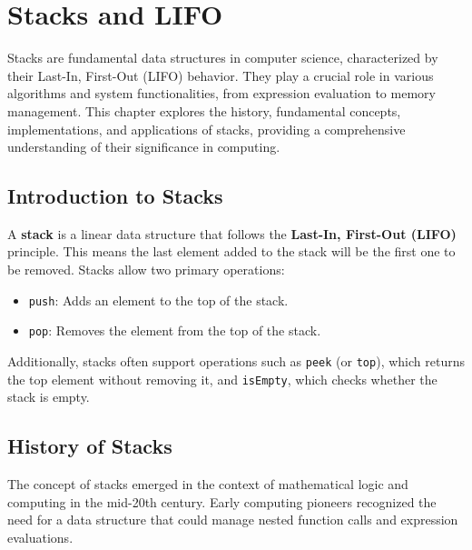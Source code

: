 
\chapter{Stacks and LIFO}

Stacks are fundamental data structures in computer science, characterized by their Last-In, First-Out (LIFO) behavior. They play a crucial role in various algorithms and system functionalities, from expression evaluation to memory management. This chapter explores the history, fundamental concepts, implementations, and applications of stacks, providing a comprehensive understanding of their significance in computing.

\section{Introduction to Stacks}

A \textbf{stack} is a linear data structure that follows the \textbf{Last-In, First-Out (LIFO)} principle. This means the last element added to the stack will be the first one to be removed. Stacks allow two primary operations:

\begin{itemize}
    \item \texttt{push}: Adds an element to the top of the stack.
    \item \texttt{pop}: Removes the element from the top of the stack.
\end{itemize}

Additionally, stacks often support operations such as \texttt{peek} (or \texttt{top}), which returns the top element without removing it, and \texttt{isEmpty}, which checks whether the stack is empty.

\section{History of Stacks}

The concept of stacks emerged in the context of mathematical logic and computing in the mid-20th century. Early computing pioneers recognized the need for a data structure that could manage nested function calls and expression evaluations.

